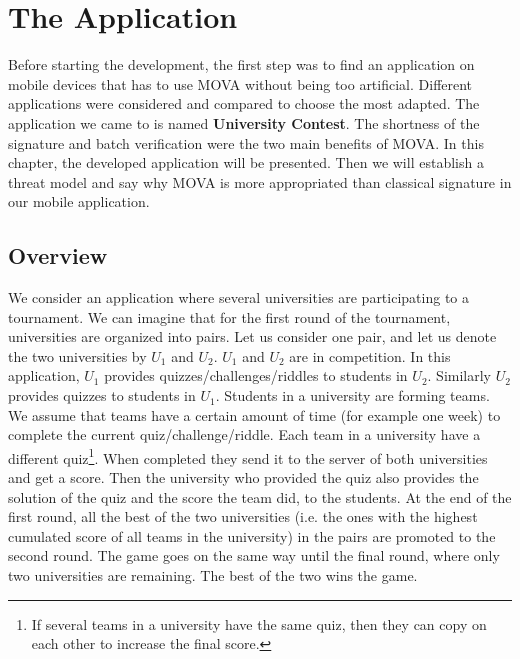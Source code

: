 \chapter{The Application}
\label{chap:application}

    Before starting the development, the first step was to find an application on mobile devices 
    that has to use MOVA without being too 
    artificial. Different applications were considered and compared to choose the most adapted. 
    The application we came to is named {\bf University Contest}. The shortness of the signature and batch verification were the two main benefits of MOVA. 
    In this chapter, the developed application will be presented. 
    Then we will establish a threat model and say why MOVA is more appropriated than classical signature in our mobile application.

    
    \section{Overview}
    \label{sec:app-overview}
    We consider an application where several universities are participating to a tournament.
    We can imagine that for the first round of the tournament, universities are organized into
    pairs. Let us consider one pair, and let us denote the two universities by $U_1$ and $U_2$. $U_1$ and $U_2$  are in competition.
    In this application, $U_1$ provides quizzes/challenges/riddles to students in $U_2$. Similarly $U_2$ provides quizzes to students in $U_1$.
    Students in a university are forming teams. We assume that teams have a certain amount of time (for example one week) to complete the current quiz/challenge/riddle. 
    Each team in a university have a different quiz\footnote{If several teams in a university have the same quiz, then they can copy on each other to increase the final score.}.
    When completed they send it to the server of both universities and get a score. Then the university who provided the quiz also provides the solution of the quiz and the score the 
    team did, to the students. At the end of the first round, all the best of the two universities 
    (i.e. the ones with the highest cumulated score of all teams in the university) in the pairs are 
    promoted to the second round. The game goes on the same way until the final round, where only two universities are remaining. The best of the two wins the game. 

